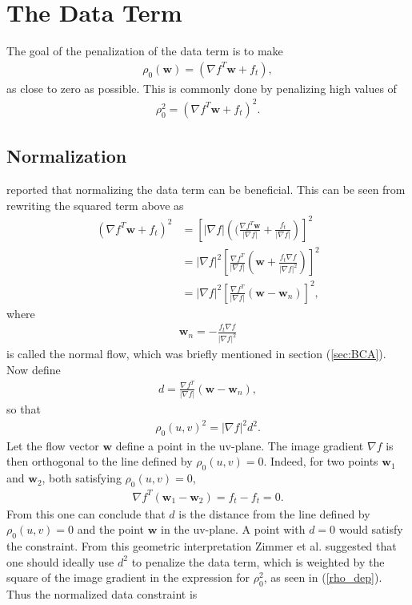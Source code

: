 \chapter{The Data Term}
The goal of the penalization of the data term is to make
\begin{align*}
\rho_0(\textbf{w}) = (\nabla f^T \textbf{w} + f_t), 
\end{align*}
as close to zero as possible. This is commonly done by penalizing high values of 
\begin{align*}
\rho_0^2 = (\nabla f^T \textbf{w} + f_t)^2.
\end{align*}
\section{Normalization}
\cite{zimmer2011optic} reported that normalizing the data term can be beneficial. This can be seen from rewriting the squared term above as
\begin{align*}
(\nabla f^T \textbf{w} + f_t)^2 &= \left[ |\nabla f| \left( (\frac{\nabla f^T \textbf{w}}{|\nabla f|} + \frac{f_t}{|\nabla f|} \right) \right]^2  \\
&= |\nabla f|^2 \left[\frac{\nabla f^T}{|\nabla f|} \left(  \textbf{w} + \frac{f_t \nabla f}{|\nabla f|^2} \right) \right]^2 \\
&= |\nabla f|^2 \left[\frac{\nabla f^T}{|\nabla f|} \left( \textbf{w} - \textbf{w}_n \right) \right]^2 ,
\end{align*}
where
\begin{align}
\textbf{w}_n = - \frac{f_t \nabla f}{|\nabla f|^2}
\end{align}
is called the normal flow, which was briefly mentioned in section (\ref{sec:BCA}). Now define 
\begin{align}
d = \frac{\nabla f^T}{|\nabla f|} \left( \textbf{w} - \textbf{w}_n \right),
\end{align}
so that
\begin{align}
\label{rho_dep}
\rho_0(u,v)^2 = |\nabla f|^2 d^2.
\end{align}
Let the flow vector $\textbf{w}$ define a point in the uv-plane. The image gradient $\nabla f$ is then orthogonal to the line defined by $\rho_0(u,v) = 0$. Indeed, for two points $\textbf{w}_1$ and $\textbf{w}_2$, both satisfying $\rho_0(u,v) = 0$,
\begin{align*}
\nabla f^T (\textbf{w}_1-\textbf{w}_2) = f_t - f_t = 0.
\end{align*}
From this one can conclude that $d$ is the distance from the line defined by $\rho_0(u,v) = 0$ and the point $\textbf{w}$ in the uv-plane. A point with $d = 0$ would satisfy the constraint. From this geometric interpretation Zimmer et al. \cite{zimmer2011optic} suggested that one should ideally use $d^2$ to penalize the data term, which is weighted by the square of the image gradient in the expression for $\rho_0^2$,  as seen in (\ref{rho_dep}). Thus the normalized data constraint is
